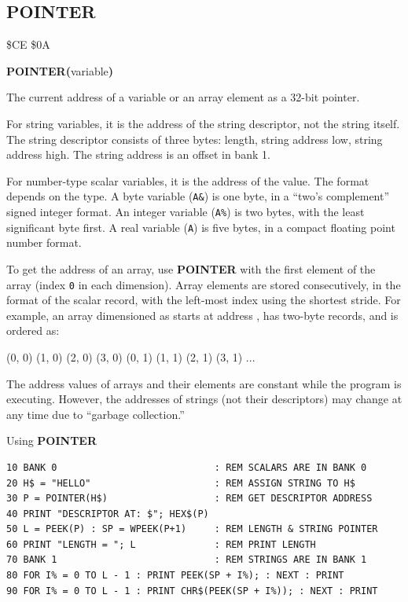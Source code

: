 \subsection{POINTER}
\begin{description}[leftmargin=2cm,style=nextline]
\item [Token:]    \$CE \$0A

\item [Format:]   {\bf POINTER(}variable{\bf)}

\item [Returns:]  The current address of a variable or an array element as a 32-bit pointer.

                  For string variables, it is the address of the string descriptor, not the string itself. The string descriptor consists of three bytes: length, string address low, string address high. The string address is an offset in bank 1.

                  For number-type scalar variables, it is the address of the value. The format depends on the type. A byte variable ({\tt A\&}) is one byte, in a ``two's complement'' signed integer format. An integer variable ({\tt A\%}) is two bytes, with the least significant byte first. A real variable ({\tt A}) is five bytes, in a compact floating point number format.

                  To get the address of an array, use {\bf POINTER} with the first element of the array (index {\tt 0} in each dimension). Array elements are stored consecutively, in the format of the scalar record, with the left-most index using the shortest stride. For example, an array dimensioned as  starts at address , has two-byte records, and is ordered as:

                  (0, 0)  (1, 0)  (2, 0)  (3, 0)  (0, 1)  (1, 1)  (2, 1)  (3, 1) ...

\item [Remarks:]  The address values of arrays and their elements are constant while the program is executing. However, the addresses of strings (not their descriptors) may change at any time due to ``garbage collection.''

\item [Example:]  Using {\bf POINTER}

\begin{tcolorbox}[colback=black,coltext=white]
\verbatimfont{\codefont}
\begin{verbatim}
10 BANK 0                            : REM SCALARS ARE IN BANK 0
20 H$ = "HELLO"                      : REM ASSIGN STRING TO H$
30 P = POINTER(H$)                   : REM GET DESCRIPTOR ADDRESS
40 PRINT "DESCRIPTOR AT: $"; HEX$(P)
50 L = PEEK(P) : SP = WPEEK(P+1)     : REM LENGTH & STRING POINTER
60 PRINT "LENGTH = "; L              : REM PRINT LENGTH
70 BANK 1                            : REM STRINGS ARE IN BANK 1
80 FOR I% = 0 TO L - 1 : PRINT PEEK(SP + I%); : NEXT : PRINT
90 FOR I% = 0 TO L - 1 : PRINT CHR$(PEEK(SP + I%)); : NEXT : PRINT


\end{verbatim}
\end{tcolorbox}
\end{description}
